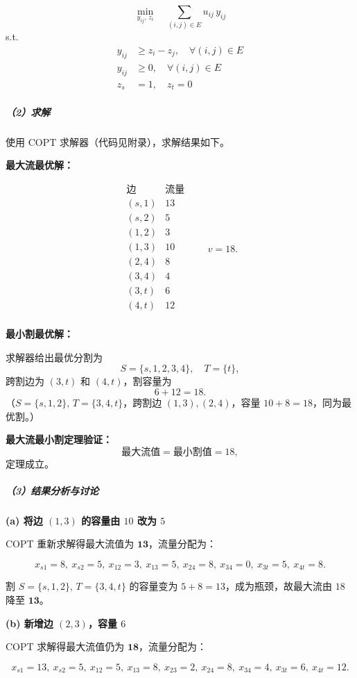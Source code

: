 \documentclass[12pt,a4paper]{article}
\begin{document}
\[
\min_{y_{ij},\,z_i} \quad \sum_{(i,j)\in E} u_{ij}\,y_{ij}
\]
s.t.
\begin{align*}
y_{ij} &\ge z_i-z_j, \quad \forall(i,j)\in E \\
y_{ij} &\ge 0, \quad \forall(i,j)\in E \\
z_s &= 1,\quad z_t = 0
\end{align*}

\subparagraph{（2）求解}

使用 COPT 求解器（代码见附录），求解结果如下。

\textbf{最大流最优解：}

\[
\begin{array}{c|c}
\textbf{边} & \textbf{流量} \\ \hline
(s,1) & 13 \\
(s,2) & 5  \\
(1,2) & 3  \\
(1,3) & 10 \\
(2,4) & 8  \\
(3,4) & 4  \\
(3,t) & 6  \\
(4,t) & 12 \\
\end{array}
\qquad v = 18.
\]

\textbf{最小割最优解：}

求解器给出最优分割为
\[
S = \{s,1,2,3,4\},\quad T = \{t\},
\]
跨割边为 $(3,t)$ 和 $(4,t)$，割容量为
\[
6 + 12 = 18.
\]
（$S=\{s,1,2\},\,T=\{3,4,t\}$，跨割边 $(1,3),(2,4)$，容量 $10+8=18$，同为最优割。）

\textbf{最大流最小割定理验证：}
\[
\text{最大流值} = \text{最小割值} = 18,
\]
定理成立。

\subparagraph{（3）结果分析与讨论}

\textbf{(a) 将边 $(1,3)$ 的容量由 $10$ 改为 $5$}

COPT 重新求解得最大流值为 $\mathbf{13}$，流量分配为：

\[
x_{s1}=8,\ x_{s2}=5,\ x_{12}=3,\ x_{13}=5,\ x_{24}=8,\ x_{34}=0,\ x_{3t}=5,\ x_{4t}=8.
\]

割 $S=\{s,1,2\},\,T=\{3,4,t\}$ 的容量变为 $5+8=13$，成为瓶颈，故最大流由 $18$ 降至 $\mathbf{13}$。

\textbf{(b) 新增边 $(2,3)$，容量 $6$}

COPT 求解得最大流值仍为 $\mathbf{18}$，流量分配为：

\[
x_{s1}=13,\ x_{s2}=5,\ x_{12}=5,\ x_{13}=8,\ x_{23}=2,\ x_{24}=8,\ x_{34}=4,\ x_{3t}=6,\ x_{4t}=12.
\]
\end{document}
